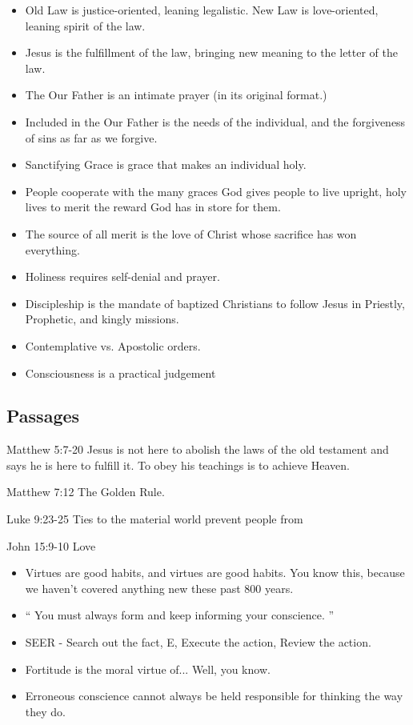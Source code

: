 \documentclass[11pt]{article}
\begin{document}
\begin{itemize}
	\item Old Law is justice-oriented, leaning legalistic.  New Law 
		is love-oriented,	leaning spirit of the law.
	\item Jesus is the fulfillment of the law, bringing new meaning 
		to the letter	of the law.
	\item The Our Father is an intimate prayer (in its original 
		format.)
	\item Included in the Our Father is the needs of the individual,
		and	the forgiveness of sins as far as we forgive.
	\item Sanctifying Grace is grace that makes an individual holy.
	\item People cooperate with the many graces God gives people 
		to live upright, holy lives to merit the reward God has in 
		store	for them.
	\item The source of all merit is the love of Christ whose 
		sacrifice has won everything.
	\item Holiness requires self-denial and prayer.
	\item Discipleship is the mandate of baptized Christians to 
		follow Jesus in Priestly, Prophetic, and kingly missions.
	\item Contemplative vs. Apostolic orders.
	\item Consciousness is a practical judgement
\end{itemize}
\subsection{Passages}
Matthew 5:7-20 
	Jesus is not here to abolish the laws of the old 
	testament	and says he is here to fulfill it.  To obey his
	teachings is to achieve Heaven.

Matthew 7:12
	The Golden Rule.

Luke 9:23-25
	Ties to the material world prevent people from 

John 15:9-10
	Love

\begin{itemize}
	\item Virtues are good habits, and virtues are
		good habits.  You know this, because we haven't
		covered anything new these past 800 years.
	\item `` You must always form and keep informing
		your conscience. ''
	\item SEER - Search out the fact, E, Execute the
		action, Review the action.
	\item Fortitude is the moral virtue of... Well, you know.
	\item Erroneous conscience cannot always be held responsible
		for thinking the way they do.
\end{itemize}
\end{document}

